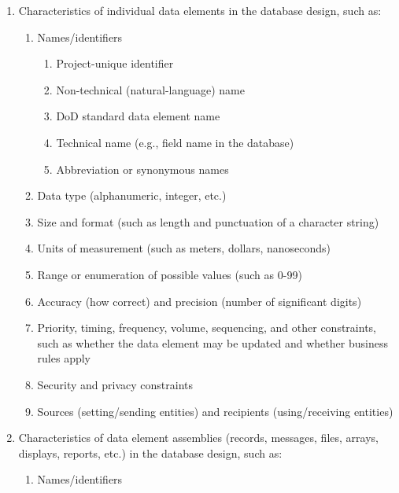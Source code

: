 \documentclass{fidata-report-template}
\begin{document}
\begin{enumerate}
\itemsep1pt\parskip0pt
\item
  Characteristics of individual data elements in the database design,
  such as:

  \begin{enumerate}
  \itemsep1pt\parskip0pt
  \item
    Names/identifiers

    \begin{enumerate}
    \itemsep1pt\parskip0pt
    \item
      Project-unique identifier
    \item
      Non-technical (natural-language) name
    \item
      DoD standard data element name
    \item
      Technical name (e.g., field name in the database)
    \item
      Abbreviation or synonymous names
    \end{enumerate}
  \item
    Data type (alphanumeric, integer, etc.)
  \item
    Size and format (such as length and punctuation of a character
    string)
  \item
    Units of measurement (such as meters, dollars, nanoseconds)
  \item
    Range or enumeration of possible values (such as 0-99)
  \item
    Accuracy (how correct) and precision (number of significant digits)
  \item
    Priority, timing, frequency, volume, sequencing, and other
    constraints, such as whether the data element may be updated and
    whether business rules apply
  \item
    Security and privacy constraints
  \item
    Sources (setting/sending entities) and recipients (using/receiving
    entities)
  \end{enumerate}
\item
  Characteristics of data element assemblies (records, messages, files,
  arrays, displays, reports, etc.) in the database design, such as:

  \begin{enumerate}
  \itemsep1pt\parskip0pt
  \item
    Names/identifiers


\end{enumerate}
\end{enumerate}
\end{document}
